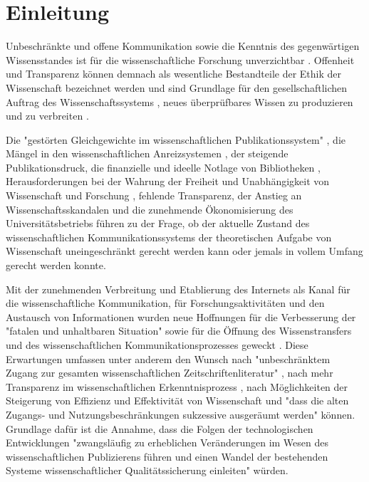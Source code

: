 \chapter{Einleitung}

Unbeschränkte und offene Kommunikation sowie die Kenntnis des gegenwärtigen Wissensstandes ist für die wissenschaftliche Forschung unverzichtbar \cite{Glaeser_2006} \cite{Gibbons_1994}. Offenheit und Transparenz können demnach als wesentliche Bestandteile der Ethik der Wissenschaft bezeichnet werden \cite{Peters_2014} \cite{Resnik_2005} und sind Grundlage für den gesellschaftlichen Auftrag des Wissenschaftssystems \cite[:3]{Hanekop_2014}, neues überprüfbares Wissen zu produzieren und zu verbreiten \cite[:551]{Luescher_2014} \cite[:298]{Luhmann_1998} \cite[:100]{graefen2007_wissenschaftliche_artikel}.

Die "gestörten Gleichgewichte im wissenschaftlichen Publikationssystem" \cite{Jospeph_2006}, die Mängel in den wissenschaftlichen Anreizsystemen \cite{Osterloh_2008}, der steigende Publikationsdruck, die finanzielle und ideelle Notlage von Bibliotheken \cite{Russell_2008} \cite{Sietmann_2007}, Herausforderungen bei der Wahrung der Freiheit und Unabhängigkeit von Wissenschaft und Forschung \cite{Goetting_2015}, fehlende Transparenz, der Anstieg an Wissenschaftsskandalen \cite{Brembs_2015} und die zunehmende Ökonomisierung des Universitätsbetriebs \cite{Bauer_2006} führen zu der Frage, ob der aktuelle Zustand des wissenschaftlichen Kommunikationssystems der theoretischen Aufgabe von Wissenschaft uneingeschränkt gerecht werden kann \cite{Schekman_2013} oder jemals in vollem Umfang gerecht werden konnte.

Mit der zunehmenden Verbreitung und Etablierung des Internets als Kanal für die wissenschaftliche Kommunikation, für Forschungsaktivitäten und den Austausch von Informationen wurden neue Hoffnungen für die Verbesserung der "fatalen und unhaltbaren Situation" \cite{Brembs_2015} sowie für die Öffnung des Wissenstransfers \cite{Schulze_2013} \cite{Albert_2006} und des wissenschaftlichen Kommunikationsprozesses geweckt \cite{Hanekop_2014} \cite{European_Commission_2006} \cite{Goodrum_2001} \cite{Lawrence_1999}. Diese Erwartungen umfassen unter anderem den Wunsch nach "unbeschränktem Zugang zur gesamten wissenschaftlichen Zeitschriftenliteratur" \cite{BOAI_2002}, nach mehr Transparenz im wissenschaftlichen Erkenntnisprozess \cite{European_Commission_2015a}, nach Möglichkeiten der Steigerung von Effizienz und Effektivität von Wissenschaft \cite{Partha_1994} und "dass die alten Zugangs- und Nutzungsbeschränkungen sukzessive ausgeräumt werden" \cite{BOAI_2002} können. Grundlage dafür ist die Annahme, dass die Folgen der technologischen Entwicklungen "zwangsläufig zu erheblichen Veränderungen im Wesen des wissenschaftlichen Publizierens führen und einen Wandel der bestehenden Systeme wissenschaftlicher Qualitätssicherung einleiten" \cite{Berliner_Erklaerung_2003} würden.

